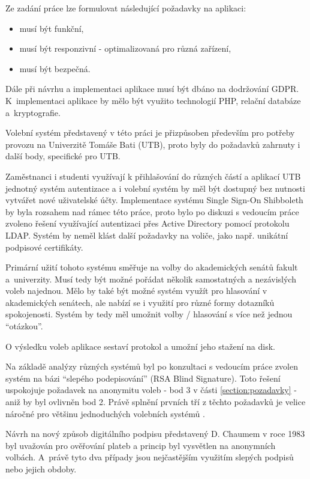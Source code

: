 Ze zadání práce lze formulovat následující požadavky na aplikaci:

\begin{itemize}
	\item musí být funkční,
	\item musí být responzivní - optimalizovaná pro různá zařízení,
	\item musí být bezpečná.
\end{itemize}

Dále při návrhu a implementaci aplikace musí být dbáno na dodržování GDPR. K~implementaci aplikace by mělo být využito technologií PHP, relační databáze a~kryptografie.

Volební systém představený v této práci je přizpůsoben především pro potřeby provozu na Univerzitě Tomáše Bati (UTB), proto byly do požadavků zahrnuty i další body, specifické pro UTB. 

Zaměstnanci i studenti využívají k přihlašování do různých částí a aplikací UTB jednotný systém autentizace a i volební systém by měl být dostupný bez nutnosti vytvářet nové uživatelské účty. Implementace systému Single Sign-On Shibboleth by byla rozsahem nad rámec této práce, proto bylo po diskuzi s vedoucím práce zvoleno řešení využívající autentizaci přes Active Directory pomocí protokolu LDAP. Systém by neměl klást další požadavky na voliče, jako např. unikátní podpisové certifikáty.

Primární užití tohoto systému směřuje na volby do akademických senátů fakult a~univerzity. Musí tedy být možné pořádat několik samostatných a nezávislých voleb najednou. Mělo by také být možné systém využít pro hlasování v akademických senátech, ale nabízí se i využití pro různé formy dotazníků spokojenosti. Systém by tedy měl umožnit volby / hlasování s více než jednou ``otázkou''.

O výsledku voleb aplikace sestaví protokol a umožní jeho stažení na disk.

Na základě analýzy různých systémů byl po konzultaci s vedoucím práce zvolen systém na bázi ``slepého podepisování'' (RSA Blind Signature)\cite{chaum}. Toto řešení uspokojuje požadavek na anonymitu voleb - bod 3 v části \ref{section:pozadavky} - aniž by byl ovlivněn bod 2. Právě splnění prvních tří z těchto požadavků je velice náročné pro většinu jednoduchých volebních systémů \cite{Schneier1996}.

Návrh na nový způsob digitálního podpisu představený D. Chaumem v roce 1983 byl uvažován pro ověřování plateb a princip byl vysvětlen na anonymních volbách. A~právě tyto dva případy jsou nejčastějším využitím slepých podpisů nebo jejich obdoby. 

